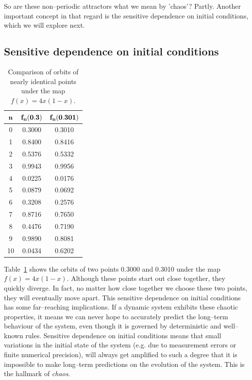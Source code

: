 So are these non--periodic attractors what we mean by 'chaos'? Partly. Another important concept in that regard is the sensitive dependence on initial conditions, which we will explore next.

\subsection{Sensitive dependence on initial conditions}

\begin{table}
\centering
\begin{tabular}{|c|c|c|}
\hline
${\bf n}$  & ${\bf f_n(0.3)}$ & ${\bf f_n(0.301)}$  \\
\hline
0  & 0.3000 & 0.3010  \\
\hline
1  & 0.8400 & 0.8416 \\
\hline
2  & 0.5376 & 0.5332 \\
\hline
3  & 0.9943 & 0.9956 \\
\hline
4  & 0.0225 & 0.0176 \\
\hline
5  & 0.0879 & 0.0692 \\
\hline
6  & 0.3208 & 0.2576 \\
\hline
7  & 0.8716 & 0.7650 \\
\hline
8  & 0.4476 & 0.7190 \\
\hline
9 & 0.9890 & 0.8081 \\
\hline
10 & 0.0434 & 0.6202 \\
\hline
\end{tabular}
\caption{Comparison of orbits of nearly identical points under the map $f(x)=4x(1-x)$.}
\label{table-sens}
\end{table}

Table~\ref{table-sens} shows the orbits of two points 0.3000 and 0.3010 under the map $f(x)=4x(1-x)$. Although these points start out close together, they quickly diverge. In fact, no matter how close together we choose these two points, they will eventually move apart. This sensitive dependence on initial conditions has some far--reaching implications. If a dynamic system exhibits these chaotic properties, it means we can never hope to accurately predict the long--term behaviour of the system, even though it is governed by deterministic and well--known rules. Sensitive dependence on initial conditions means that small variations in the initial state of the system (e.g. due to measurement errors or finite numerical precision), will always get amplified to such a degree that it is impossible to make long--term predictions on the evolution of the system. This is the hallmark of \emph{chaos}.

